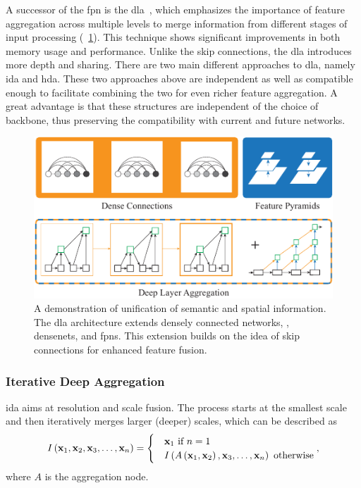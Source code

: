 
A successor of the \gls{fpn} is the \gls{dla}~\cite{yu2019dla}, which emphasizes the importance of feature aggregation across multiple levels to merge information from different stages of input processing (\figtext{}~\ref{fig:DLAMotivation}). This technique shows significant improvements in both memory usage and performance. Unlike the skip connections, the \gls{dla} introduces more depth and sharing. There are two main different approaches to \gls{dla}, namely \gls{ida} and \gls{hda}. These two approaches above are independent as well as compatible enough to facilitate combining the two for even richer feature aggregation. A great advantage is that these structures are independent of the choice of backbone, thus preserving the compatibility with current and future networks.

\begin{figure}[t]
    \centerline{\includegraphics[width=0.6\linewidth]{figures/theoretical_foundations/dla_comparison.pdf}}
    \caption[\gls{dla} comparison]{A demonstration of unification of semantic and spatial information. The \gls{dla} architecture extends densely connected networks, \ietext{}, \glspl{densenet}, and \glspl{fpn}. This extension builds on the idea of skip connections for enhanced feature fusion. }
    \label{fig:DLAMotivation}
\end{figure}

\subsubsection{Iterative Deep Aggregation}

\gls{ida} aims at resolution and scale fusion. The process starts at the smallest scale and then iteratively merges larger (deeper) scales, which can be described as
\begin{equation}
    \label{eq:IterativeDeepAggregation}
    {I} \left( \mathbf{x}_1, \mathbf{x}_2, \mathbf{x}_3, \dots, \mathbf{x}_n \right) =
    \begin{cases}
         & \mathbf{x}_1 \text{ if } n = 1                                                                \\
         & {I} \left( {A} \left( \mathbf{x}_1, \mathbf{x}_2 \right), \mathbf{x}_3, \dots, \mathbf{x}_n \right) \text{ otherwise}
    \end{cases},
\end{equation}
where $A$ is the aggregation node.

